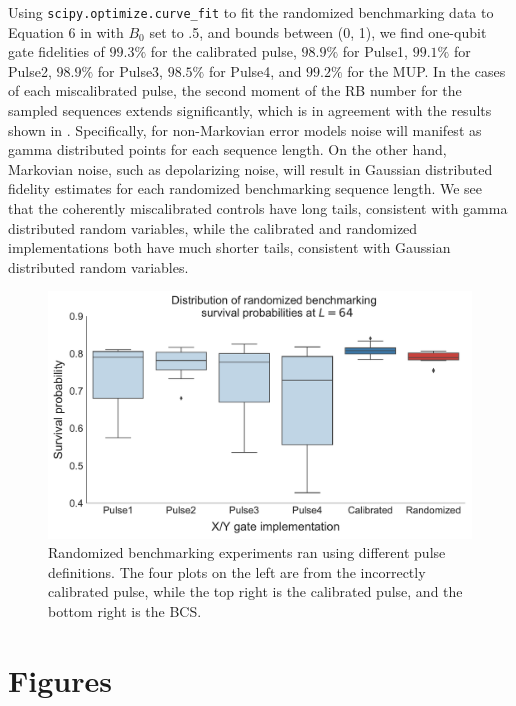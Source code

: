 \documentclass[aps,nofootinbib,pra,notitlepage,twocolumn]{revtex4-1}
\begin{document}
Using \texttt{scipy.optimize.curve\_fit} to fit the randomized benchmarking data to Equation 6 in \cite{Magesan2011} with $B_0$ set to .5, and bounds between (0, 1), we find one-qubit gate fidelities of $99.3\%$ for the calibrated pulse, $98.9\%$ for Pulse1, $99.1\%$ for Pulse2, $98.9\%$ for Pulse3, $98.5\%$ for Pulse4, and $99.2\%$ for the MUP. In the cases of each miscalibrated pulse, the second moment of the RB number\cite{Proctor2017} for the sampled sequences extends significantly, which is in agreement with the results shown in \cite{Ball2016}. Specifically, for non-Markovian error models noise will manifest as gamma distributed points for each sequence length. On the other hand, Markovian noise, such as depolarizing noise, will result in Gaussian distributed fidelity estimates for each randomized benchmarking sequence length. We see that the coherently miscalibrated controls have long tails, consistent with gamma distributed random variables, while the calibrated and randomized implementations both have much shorter tails, consistent with Gaussian distributed random variables. 

\begin{figure}
  \centering
  \includegraphics[width=\columnwidth]{rb_data.pdf}
  \caption{Randomized benchmarking experiments ran using different pulse definitions. The four plots on the left are from the incorrectly calibrated pulse, while the top right is the calibrated pulse, and the bottom right is the BCS.}
  \label{fig:rb}
\end{figure}




\section{Figures}
\label{sec:figures}
\end{document}
